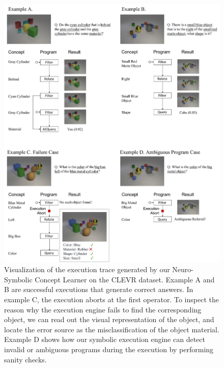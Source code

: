 \documentclass{article} %
\begin{document}
{\begin{figure}[ht]
\centering
\includegraphics[width=\textwidth]{raw/CLEVRInference.pdf}
\caption{Visualization of the execution trace generated by our Neuro-Symbolic Concept Learner on the CLEVR dataset. Example A and B are successful executions that generate correct answers. In example C, the execution aborts at the first operator. To inspect the reason why the execution engine fails to find the corresponding object, we can read out the visual representation of the object, and locate the error source as the misclassification of the object material. Example D shows how our symbolic execution engine can detect invalid or ambiguous programs during the execution by performing sanity checks.}
\label{fig:visualization}
\end{figure}

}
\end{document}
